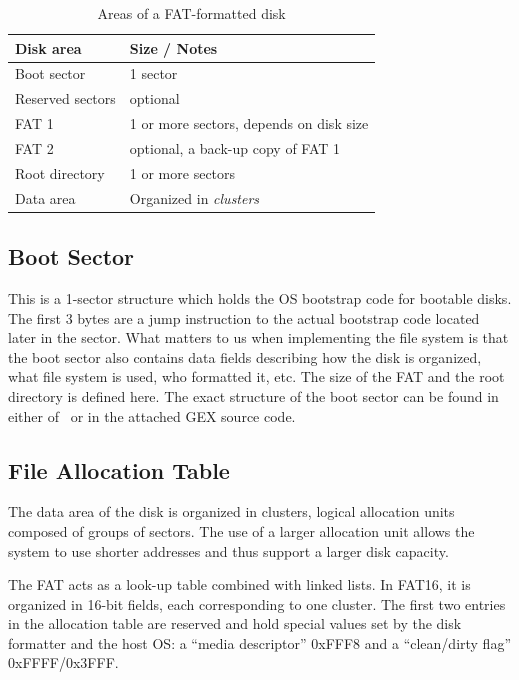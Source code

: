 \begin{table}[h]
	\centering
	\begin{tabular}{ll}
		\toprule
		\textbf{Disk area} & \textbf{Size / Notes} \\
		\midrule
		Boot sector & 1 sector \\
		Reserved sectors & optional \\
		FAT 1 & 1 or more sectors, depends on disk size \\
		FAT 2 & optional, a back-up copy of FAT 1 \\
		Root directory & 1 or more sectors \\
		Data area & Organized in \textit{clusters} \\
		\bottomrule
	\end{tabular}
	\caption{\label{tab:fat16-disk-areas}Areas of a FAT-formatted disk}
\end{table}

\subsection{Boot Sector}

This is a 1-sector structure which holds the \gls{OS} bootstrap code for bootable disks. The first 3 bytes are a jump instruction to the actual bootstrap code located later in the sector. What matters to us when implementing the file system is that the boot sector also contains data fields describing how the disk is organized, what file system is used, who formatted it, etc. The size of the \gls{FAT} and the root directory is defined here. The exact structure of the boot sector can be found in either of~\cite{ms-fat,fat16-brainy,fat16-maverick,fat16-phobos,fat-whitepaper} or in the attached GEX source code.

\subsection{File Allocation Table}

The data area of the disk is organized in clusters, logical allocation units composed of groups of sectors. The use of a larger allocation unit allows the system to use shorter addresses and thus support a larger disk capacity.

The \gls{FAT} acts as a look-up table combined with linked lists. In FAT16, it is organized in 16-bit fields, each corresponding to one cluster. The first two entries in the allocation table are reserved and hold special values set by the disk formatter and the host \gls{OS}: a ``media descriptor'' 0xFFF8 and a ``clean/dirty flag'' 0xFFFF/0x3FFF.

